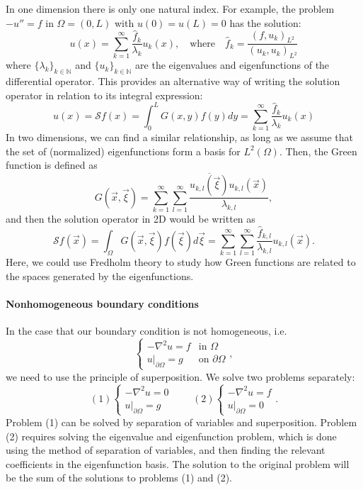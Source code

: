 In one dimension there is only one natural index. For example, the problem $-u''=f$ in $\Omega=(0,L)$ with $u(0)=u(L)=0$ has the solution: 
\begin{equation*}
    u(x)=\sum_{k=1}^{\infty}\frac{\hat{f}_{k}}{\lambda_{k}}u_{k}(x), \quad \text{where} \quad \hat{f}_{k}=\frac{(f,u_{k})_{L^{2}}}{(u_{k},u_{k})_{L^{2}}}
\end{equation*}
where $\{\lambda_{k}\}_{k\in\mathbb{N}}$ and $\{u_{k}\}_{k\in\mathbb{N}}$ are the eigenvalues and eigenfunctions of the differential operator. This provides an alternative way of writing the solution operator in relation to its integral expression: 
\begin{equation*}
    u(x)=\mathcal{S}f(x)=\int_{0}^{L}G(x,y)f(y)dy=\sum_{k=1}^{\infty}\frac{\hat{f}_{k}}{\lambda_{k}}u_{k}(x)
\end{equation*}
In two dimensions, we can find a similar relationship, as long as we assume that the set of (normalized) eigenfunctions form a basis for $L^{2}(\Omega)$. Then, the Green function is defined as
\begin{equation*}
    G(\vec{x},\vec{\xi})=\sum_{k=1}^{\infty}\sum_{l=1}^{\infty}\frac{\overline{u_{k,l}(\vec{\xi})}u_{k,l}(\vec{x})}{\lambda_{k,l}},
\end{equation*}
and then the solution operator in 2D would be written as
\begin{equation*}
    \mathcal{S}f(\vec{x})=\int_{\Omega}G(\vec{x},\vec{\xi})f(\vec{\xi})d\vec{\xi}=\sum_{k=1}^{\infty}\sum_{l=1}^{\infty}\frac{\hat{f}_{k,l}}{\lambda_{k,l}}u_{k,l}(\vec{x}).
\end{equation*}
Here, we could use Fredholm theory to study how Green functions are related to the spaces generated by the eigenfunctions. 
\paragraph{Nonhomogeneous boundary conditions} In the case that our boundary condition is not homogeneous, i.e. 
\begin{equation*}
    \begin{cases}-\nabla^{2}u=f&\text{in }\Omega\\ u|_{\partial\Omega}=g&\text{on }\partial\Omega\end{cases},
\end{equation*}
we need to use the principle of superposition. We solve two problems separately: 
\begin{equation*}
    (1)\begin{cases}-\nabla^{2}u=0\\ u|_{\partial\Omega}=g\end{cases}\qquad (2)\begin{cases}-\nabla^{2}u=f\\ u|_{\partial\Omega}=0\end{cases}.
\end{equation*}
Problem (1) can be solved by separation of variables and superposition. Problem (2) requires solving the eigenvalue and eigenfunction problem, which is done using the method of separation of variables, and then finding the relevant coefficients in the eigenfunction basis. The solution to the original problem will be the sum of the solutions to problems (1) and (2).

